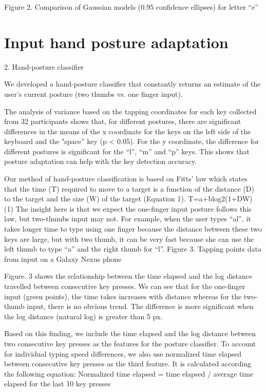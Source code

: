 \documentclass{sigchi}
\begin{document}
Figure 2. Comparison of Gaussian models (0.95 confidence ellipses) for letter “e”

\section{Input hand posture adaptation}
2. Hand-posture classifier 

We developed a hand-posture classifier that constantly returns an estimate of the user’s current posture (two thumbs vs. one finger input).

The analysis of variance based on the tapping coordinates for each key collected from 32 participants shows that, for different postures, there are significant differences in the means of the x coordinate for the keys on the left side of the keyboard and the "space” key (p < 0.05). For the y coordinate, the difference for different postures is significant for the “l”, “m” and “p” keys. This shows that posture adaptation can help with the key detection accuracy.

Our method of hand-posture classification is based on Fitts’ law which states that the time (T) required to move to a target is a function of the distance (D) to the target and the size (W) of the target (Equation 1).
T=a+blog2(1+DW)                                                  (1)
The insight here is that we expect the one-finger input posture follows this law,  but two-thumbs input may not. For example, when the user types “al”, it takes longer time to type using one finger because the distance between these two keys are large, but with two thumb, it can be very fast because she can use the left thumb to type “a” and the right thumb for “l”.
Figure 3. Tapping points data from input on a Galaxy Nexus phone

Figure. 3 shows the relationship between the time elapsed  and the log distance travelled between consecutive key presses. We can see that for the one-finger input (green points), the time takes increases with distance whereas for the two-thumb input, there is no obvious trend. The difference is more significant when the log distance (natural log) is greater than 5 px.

Based on this finding, we include the time elapsed and the log distance between two consecutive key presses as the features for the posture classifier. To account for individual typing speed differences, we also use normalized time elapsed between consecutive key presses as the third feature. It is calculated according the following equation:
Normalized time elapsed = time elapsed / average time elapsed for the last 10 key presses
\end{document}
